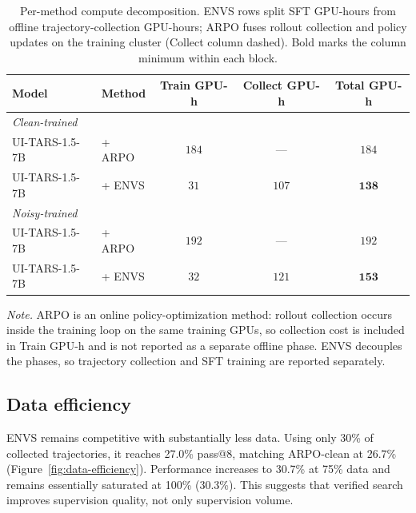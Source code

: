 \documentclass[11pt]{article}
\begin{document}
\begin{table}[H]
  \caption{Per-method compute decomposition. ENVS rows split SFT
  GPU-hours from offline trajectory-collection GPU-hours; ARPO fuses
  rollout collection and policy updates on the training cluster (Collect
  column dashed). Bold marks the column minimum within each block.}
  \label{tab:compute}
  \centering
  \small
  \begin{tabular}{llccc}
    \toprule
    Model           & Method           & Train GPU-h & Collect GPU-h & Total GPU-h                 \\
    \midrule
    \multicolumn{5}{l}{\textit{Clean-trained}} \\
    UI-TARS-1.5-7B  & + ARPO           & $184$       & ---           & $184$                       \\
    UI-TARS-1.5-7B  & + ENVS           & $31$        & $107$         & $\mathbf{138}$              \\
    \midrule
    \multicolumn{5}{l}{\textit{Noisy-trained}} \\
    UI-TARS-1.5-7B  & + ARPO           & $192$       & ---           & $192$                       \\
    UI-TARS-1.5-7B  & + ENVS           & $32$        & $121$         & $\mathbf{153}$              \\
    \bottomrule
  \end{tabular}

  \vspace{0.9em}
  \begin{minipage}{0.92\linewidth}
  \footnotesize
  \emph{Note.} ARPO is an online policy-optimization method: rollout collection occurs inside the training loop on the same training GPUs, so collection cost is included in Train GPU-h and is not reported as a separate offline phase. ENVS decouples the phases, so trajectory collection and SFT training are reported separately.
  \end{minipage}
\end{table}


\subsection{Data efficiency}
ENVS remains competitive with substantially less data. Using only 30\%
of collected trajectories, it reaches 27.0\% pass@8, matching ARPO-clean
at 26.7\% (Figure~\ref{fig:data-efficiency}). Performance increases to
30.7\% at 75\% data and remains essentially saturated at 100\%
(30.3\%). This suggests that verified search improves supervision
quality, not only supervision volume.
\end{document}
